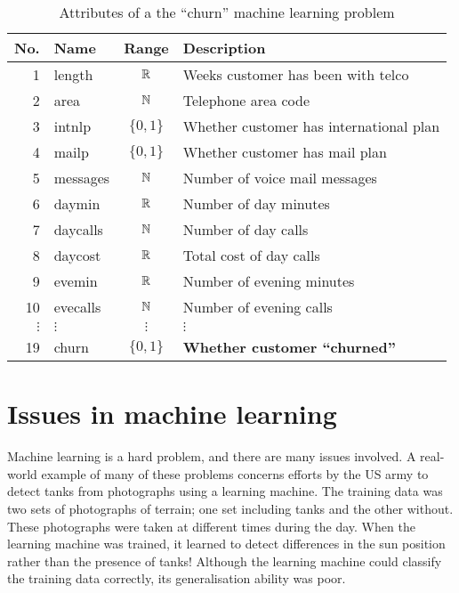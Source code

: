 \begin{table}
\newcommand{\szo}{\{0,1\}}
\begin{center}
\begin{tabular}{r l c l}
\small
{\bf No.} & {\bf Name} & {\bf Range} & {\bf Description} \\
\hline
 1 & length      & $\mathbb{R}$ & Weeks customer has been with telco \\
 2 & area        & $\mathbb{N}$ & Telephone area code \\
 3 & intnlp      & $\szo$ & Whether customer has international plan \\
 4 & mailp       & $\szo$ & Whether customer has mail plan \\
 5 & messages    & $\mathbb{N}$ & Number of voice mail messages \\
 6 & daymin      & $\mathbb{R}$ & Number of day minutes \\
 7 & daycalls    & $\mathbb{N}$ & Number of day calls \\
 8 & daycost     & $\mathbb{R}$ & Total cost of day calls \\
 9 & evemin      & $\mathbb{R}$ & Number of evening minutes \\
10 & evecalls    & $\mathbb{N}$ & Number of evening calls \\
$\vdots$ & $\vdots$ & $\vdots$ & $\vdots$ \\
19 & churn       & $\szo$ & {\bf Whether customer ``churned''} \\
\end{tabular}
\end{center}
\caption{Attributes of a the ``churn'' machine learning problem}
\label{table:churn attributes}
\end{table}

\section{Issues in machine learning}

Machine learning is a hard problem, and there are many issues
involved.  A real-world example of many of these problems concerns
efforts by the US army to detect tanks from photographs using a
learning machine.  The training data was two sets of photographs of
terrain; one set including tanks and the other without.  These
photographs were taken at different times during the day.  When the
learning machine was trained, it learned to detect differences in the
sun position rather than the presence of tanks! Although the learning
machine could classify the training data correctly, its generalisation
ability was poor.

